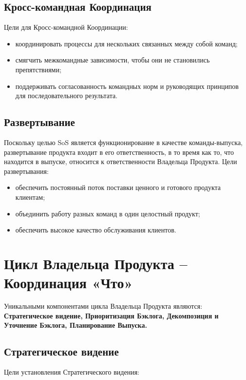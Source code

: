 \documentclass[12pt,a4paper,parskip=full]{scrartcl}
\begin{document}
\subsection{Кросс-командная Координация}

Цели для Кросс-командной Координации:

\begin{itemize}
	\item координировать процессы для нескольких связанных между собой команд; 
	\item смягчить межкомандные зависимости, чтобы они не становились препятствиями;
	\item поддерживать согласованность командных норм и руководящих принципов для последовательного результата.
\end{itemize}

\subsection{Развертывание}

Поскольку целью SoS является функционирование в качестве команды-выпуска, развертывание продукта входит в его ответственность, в то время как то, что находится в выпуске, относится к ответственности Владельца Продукта. Цели развертывания:

\begin{itemize}
	\item обеспечить постоянный поток поставки ценного и готового продукта клиентам; 
	\item объединить работу разных команд в один целостный продукт; 
	\item обеспечить высокое качество обслуживания клиентов.
\end{itemize}

\section{Цикл Владельца Продукта  – Координация «Что»}

 Уникальными компонентами цикла Владельца Продукта являются: \textbf{Стратегическое видение, Приоритизация Бэклога, Декомпозиция и Уточнение Бэклога, Планирование Выпуска.}

\subsection{Стратегическое видение}

Цели установления Стратегического видения: 
\end{document}

